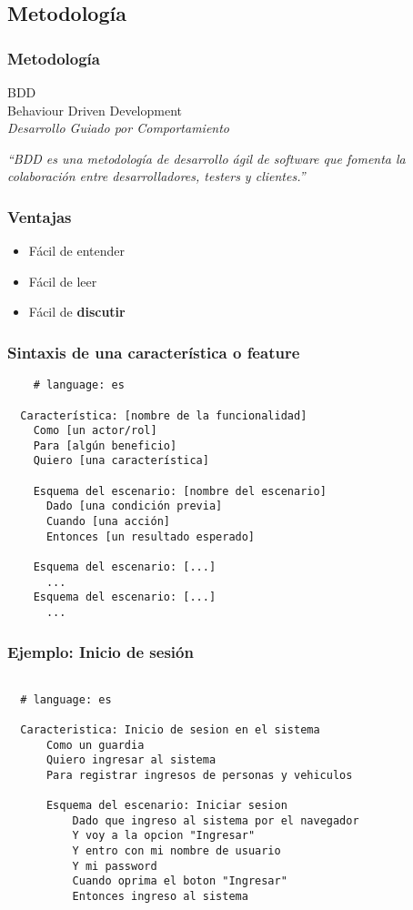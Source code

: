 \documentclass{beamer}
\begin{document}
\begin{frame}
  \section{Metodolog\'ia}
  \frametitle{Metodolog\'ia}
  \begin{center}
    {\huge BDD} \\
    Behaviour Driven Development \\
    \vspace{1cm}
    {\it Desarrollo Guiado por Comportamiento}

    {\it ``BDD es una metodología de desarrollo ágil de software que fomenta la colaboración
    entre desarrolladores, testers y clientes.''}
  \end{center}
\end{frame}

\begin{frame}
  \frametitle{Ventajas}
  \begin{itemize}
    \item Fácil de entender
    \item Fácil de leer
    \item Fácil de {\bfseries discutir}
  \end{itemize}
\end{frame}

\begin{frame}[fragile]
  \frametitle{Sintaxis de una característica o feature}
  \begin{verbatim}
    # language: es

  Característica: [nombre de la funcionalidad]
    Como [un actor/rol]
    Para [algún beneficio]
    Quiero [una característica]

    Esquema del escenario: [nombre del escenario]
      Dado [una condición previa]
      Cuando [una acción]
      Entonces [un resultado esperado]

    Esquema del escenario: [...]
      ...
    Esquema del escenario: [...]
      ...
  \end{verbatim}
\end{frame}

\begin{frame}[fragile]
  \frametitle{Ejemplo: Inicio de sesión}
  \begin{verbatim}

  # language: es

  Caracteristica: Inicio de sesion en el sistema
      Como un guardia
      Quiero ingresar al sistema
      Para registrar ingresos de personas y vehiculos

      Esquema del escenario: Iniciar sesion
          Dado que ingreso al sistema por el navegador
          Y voy a la opcion "Ingresar"
          Y entro con mi nombre de usuario
          Y mi password
          Cuando oprima el boton "Ingresar"
          Entonces ingreso al sistema
  \end{verbatim}
\end{frame}
\end{document}
